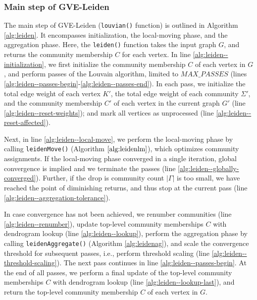 \subsubsection{Main step of GVE-Leiden}

The main step of GVE-Leiden (\texttt{louvian()} function) is outlined in Algorithm \ref{alg:leiden}. It encompasses initialization, the local-moving phase, and the aggregation phase. Here, the \texttt{leiden()} function takes the input graph $G$, and returns the community membership $C$ for each vertex. In line \ref{alg:leiden--initialization}, we first initialize the community membership $C$ of each vertex in $G$, and perform passes of the Louvain algorithm, limited to $MAX\_PASSES$ (lines \ref{alg:leiden--passes-begin}-\ref{alg:leiden--passes-end}). In each pass, we initialize the total edge weight of each vertex $K'$, the total edge weight of each community $\Sigma'$, and the community membership $C'$ of each vertex in the current graph $G'$ (line \ref{alg:leiden--reset-weights}); and mark all vertices as unprocessed (line \ref{alg:leiden--reset-affected}).

Next, in line \ref{alg:leiden--local-move}, we perform the local-moving phase by calling \texttt{leidenMove()} (Algorithm $\ref{alg:leidenlm}$), which optimizes community assignments. If the local-moving phase converged in a single iteration, global convergence is implied and we terminate the passes (line \ref{alg:leiden--globally-converged}). Further, if the drop is community count $|\Gamma|$ is too small, we have reached the point of diminishing returns, and thus stop at the current pass (line \ref{alg:leiden--aggregation-tolerance}).

In case convergence has not been achieved, we renumber communities (line \ref{alg:leiden--renumber}), update top-level community memberships $C$ with dendrogram lookup (line \ref{alg:leiden--lookup}), perform the aggregation phase by calling \texttt{leidenAggregate()} (Algorithm \ref{alg:leidenag}), and scale the convergence threshold for subsequent passes, i.e., perform threshold scaling (line \ref{alg:leiden--threshold-scaling}). The next pass continues in line \ref{alg:leiden--passes-begin}. At the end of all passes, we perform a final update of the top-level community memberships $C$ with dendrogram lookup (line \ref{alg:leiden--lookup-last}), and return the top-level community membership $C$ of each vertex in $G$.








